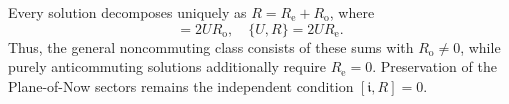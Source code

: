Every solution decomposes uniquely as $R=R_{\mathrm{e}}+R_{\mathrm{o}}$, where
\begin{equation}
    [U,R]=2UR_{\mathrm{o}},\quad \{U,R\}=2UR_{\mathrm{e}}.
\end{equation}
Thus, the general noncommuting class consists of these sums with $R_{\mathrm{o}}\neq0$, while purely anticommuting solutions additionally require $R_{\mathrm{e}}=0$. Preservation of the Plane-of-Now sectors remains the independent condition $[\mathfrak{i},R]=0$.
